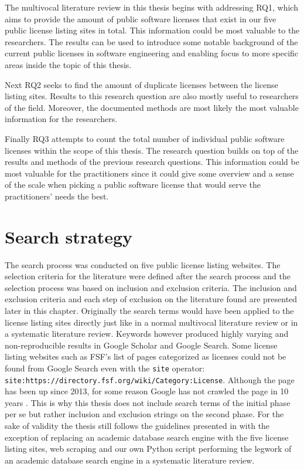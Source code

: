 The multivocal literature review in this thesis begins with addressing RQ1, which aims to provide the amount of public software licenses that exist in our five public license listing sites in total. This information could be most valuable to the researchers. The results can be used to introduce some notable background of the current public licenses in software engineering and enabling focus to more specific areas inside the topic of this thesis.

Next RQ2 seeks to find the amount of duplicate licenses between the license listing sites. Results to this research question are also mostly useful to researchers of the field. Moreover, the documented methods are most likely the most valuable information for the researchers.

Finally RQ3 attempts to count the total number of individual public software licenses within the scope of this thesis. The research question builds on top of the results and methods of the previous research questions. This information could be most valuable for the practitioners since it could give some overview and a sense of the scale when picking a public software license that would serve the practitioners' needs the best.

\section{Search strategy}
The search process was conducted on five public license listing websites. The selection criteria for the literature were defined after the search process and the selection process was based on inclusion and exclusion criteria. The inclusion and exclusion criteria and each step of exclusion on the literature found are presented later in this chapter. Originally the search terms would have been applied to the license listing sites directly just like in a normal multivocal literature review or in a systematic literature review. Keywords however produced highly varying and non-reproducible results in Google Scholar and Google Search. Some license listing websites such as FSF's list of pages categorized as licenses could not be found from Google Search even with the \texttt{site} operator: \\
\texttt{site:https://directory.fsf.org/wiki/Category:License}. Although the page has been up since 2013, for some reason Google has not crawled the page in 10 years \citep{fsf:licenselist}. This is why this thesis does not include search terms of the initial phase per se but rather inclusion and exclusion strings on the second phase. For the sake of validity the thesis still follows the guidelines presented in \cite{kitchenham2007} with the exception of replacing an academic database search engine with the five license listing sites, web scraping and our own Python script performing the legwork of an academic database search engine in a systematic literature review.

